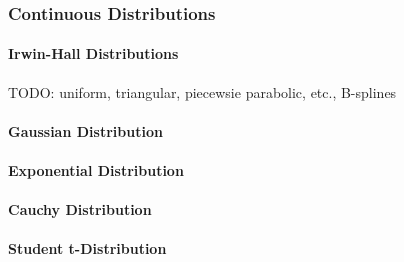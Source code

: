 \subsubsection{Continuous Distributions}

\paragraph{Irwin-Hall Distributions} TODO: uniform, triangular, piecewsie parabolic, etc., B-splines

\paragraph{Gaussian Distribution}








\paragraph{Exponential Distribution}

\paragraph{Cauchy Distribution}

\paragraph{Student t-Distribution}


